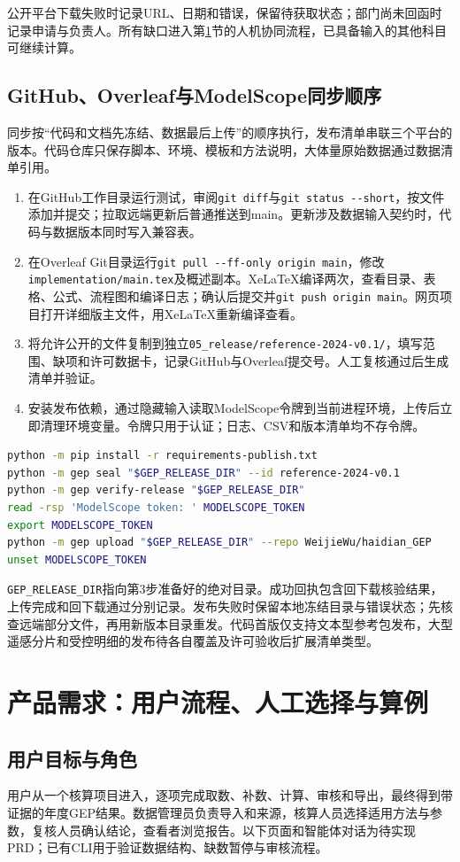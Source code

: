 \documentclass[12pt,a4paper,fontset=fandol]{ctexart}
\newcommand{\file}[1]{\nolinkurl{#1}}
\begin{document}
公开平台下载失败时记录URL、日期和错误，保留待获取状态；部门尚未回函时记录申请与负责人。所有缺口进入第\ref{sec:prd}节的人机协同流程，已具备输入的其他科目可继续计算。

\subsection{GitHub、Overleaf与ModelScope同步顺序}
同步按“代码和文档先冻结、数据最后上传”的顺序执行，发布清单串联三个平台的版本。代码仓库只保存脚本、环境、模板和方法说明，大体量原始数据通过数据清单引用。
\begin{enumerate}
\item 在GitHub工作目录运行测试，审阅\file{git diff}与\file{git status --short}，按文件添加并提交；拉取远端更新后普通推送到main。更新涉及数据输入契约时，代码与数据版本同时写入兼容表。
\item 在Overleaf Git目录运行\file{git pull --ff-only origin main}，修改\file{implementation/main.tex}及概述副本。XeLaTeX编译两次，查看目录、表格、公式、流程图和编译日志；确认后提交并\file{git push origin main}。网页项目打开详细版主文件，用XeLaTeX重新编译查看。
\item 将允许公开的文件复制到独立\file{05_release/reference-2024-v0.1/}，填写范围、缺项和许可数据卡，记录GitHub与Overleaf提交号。人工复核通过后生成清单并验证。
\item 安装发布依赖，通过隐藏输入读取ModelScope令牌到当前进程环境，上传后立即清理环境变量。令牌只用于认证；日志、CSV和版本清单均不存令牌。
\end{enumerate}
\begin{lstlisting}[language=bash]
python -m pip install -r requirements-publish.txt
python -m gep seal "$GEP_RELEASE_DIR" --id reference-2024-v0.1
python -m gep verify-release "$GEP_RELEASE_DIR"
read -rsp 'ModelScope token: ' MODELSCOPE_TOKEN
export MODELSCOPE_TOKEN
python -m gep upload "$GEP_RELEASE_DIR" --repo WeijieWu/haidian_GEP
unset MODELSCOPE_TOKEN
\end{lstlisting}
\file{GEP_RELEASE_DIR}指向第3步准备好的绝对目录。成功回执包含回下载核验结果，上传完成和回下载通过分别记录。发布失败时保留本地冻结目录与错误状态；先核查远端部分文件，再用新版本目录重发。代码首版仅支持文本型参考包发布，大型遥感分片和受控明细的发布待各自覆盖及许可验收后扩展清单类型。

\section{产品需求：用户流程、人工选择与算例}\label{sec:prd}
\subsection{用户目标与角色}
用户从一个核算项目进入，逐项完成取数、补数、计算、审核和导出，最终得到带证据的年度GEP结果。数据管理员负责导入和来源，核算人员选择适用方法与参数，复核人员确认结论，查看者浏览报告。以下页面和智能体对话为待实现PRD；已有CLI用于验证数据结构、缺数暂停与审核流程。
\end{document}
